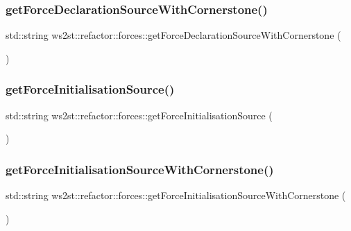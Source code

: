 \subsubsection{\texorpdfstring{get\+Force\+Declaration\+Source\+With\+Cornerstone()}{getForceDeclarationSourceWithCornerstone()}}
{\footnotesize\ttfamily std\+::string ws2st\+::refactor\+::forces\+::get\+Force\+Declaration\+Source\+With\+Cornerstone (\begin{DoxyParamCaption}{ }\end{DoxyParamCaption})}

\mbox{\label{namespacews2st_1_1refactor_1_1forces_ac7eb52bdfe754cdbdc6328e288668663}} 
\subsubsection{\texorpdfstring{get\+Force\+Initialisation\+Source()}{getForceInitialisationSource()}}
{\footnotesize\ttfamily std\+::string ws2st\+::refactor\+::forces\+::get\+Force\+Initialisation\+Source (\begin{DoxyParamCaption}{ }\end{DoxyParamCaption})}

\mbox{\label{namespacews2st_1_1refactor_1_1forces_ac9a46a9f1508ae2a2ecad5f20212642d}} 
\subsubsection{\texorpdfstring{get\+Force\+Initialisation\+Source\+With\+Cornerstone()}{getForceInitialisationSourceWithCornerstone()}}
{\footnotesize\ttfamily std\+::string ws2st\+::refactor\+::forces\+::get\+Force\+Initialisation\+Source\+With\+Cornerstone (\begin{DoxyParamCaption}{ }\end{DoxyParamCaption})}

